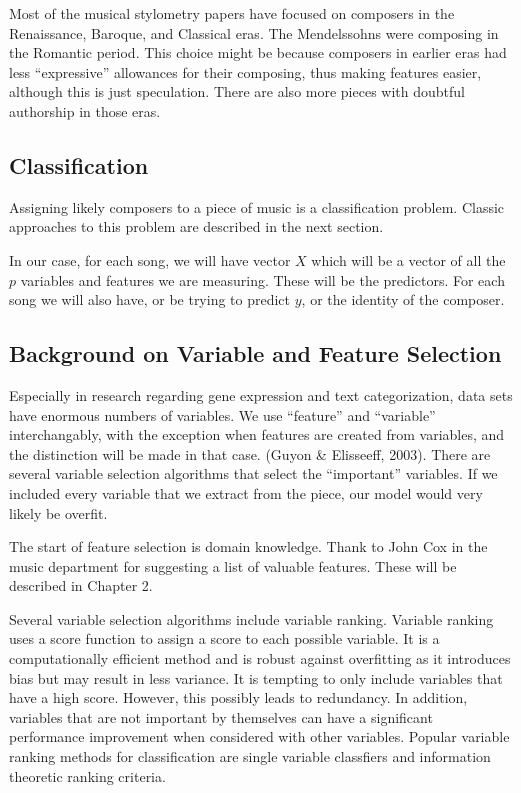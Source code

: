\documentclass[12pt,twoside]{reedthesis}
\theoremstyle{definition}
\theoremstyle{definition}
\theoremstyle{definition}
\theoremstyle{remark}
\begin{document}
Most of the musical stylometry papers have focused on composers in the
Renaissance, Baroque, and Classical eras. The Mendelssohns were
composing in the Romantic period. This choice might be because composers
in earlier eras had less ``expressive'' allowances for their composing,
thus making features easier, although this is just speculation. There
are also more pieces with doubtful authorship in those eras.

\subsection{Classification}\label{classification}

Assigning likely composers to a piece of music is a classification
problem. Classic approaches to this problem are described in the next
section.

In our case, for each song, we will have vector \(X\) which will be a
vector of all the \(p\) variables and features we are measuring. These
will be the predictors. For each song we will also have, or be trying to
predict \(y\), or the identity of the composer.

\subsection{Background on Variable and Feature
Selection}\label{background-on-variable-and-feature-selection}

Especially in research regarding gene expression and text
categorization, data sets have enormous numbers of variables. We use
``feature'' and ``variable'' interchangably, with the exception when
features are created from variables, and the distinction will be made in
that case. (Guyon \& Elisseeff, 2003). There are several variable
selection algorithms that select the ``important'' variables. If we
included every variable that we extract from the piece, our model would
very likely be overfit.

The start of feature selection is domain knowledge. Thank to John Cox in
the music department for suggesting a list of valuable features. These
will be described in Chapter 2.

Several variable selection algorithms include variable ranking. Variable
ranking uses a score function to assign a score to each possible
variable. It is a computationally efficient method and is robust against
overfitting as it introduces bias but may result in less variance. It is
tempting to only include variables that have a high score. However, this
possibly leads to redundancy. In addition, variables that are not
important by themselves can have a significant performance improvement
when considered with other variables. Popular variable ranking methods
for classification are single variable classfiers and information
theoretic ranking criteria.
\end{document}
